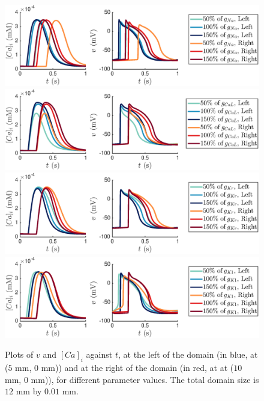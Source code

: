 \documentclass[12pt,a4paper]{article}
\begin{document}
%
\begin{figure}
   \includegraphics[trim=3cm 0cm 4cm 0cm, clip=true, width=1\linewidth]{strip_gna} 
   \includegraphics[trim=3cm 0cm 4cm 0cm, clip=true, width=1\linewidth]{strip_gcal} 
      \includegraphics[trim=3cm 0cm 4cm 0cm, clip=true, width=1\linewidth]{strip_gkr} 
         \includegraphics[trim=3cm 0cm 4cm 0cm, clip=true, width=1\linewidth]{strip_gk1} 
    \caption{Plots of $v$ and $[Ca]_i$ against $t$, at the left of the domain (in blue, at ($5$ mm, $0$ mm)) and at the right of the domain (in red, at at ($10$ mm, $0$ mm)), for different parameter values. The total domain size is $12$ mm by $0.01$ mm.}
    \label{fig:4}
\end{figure}
%
\end{document}
